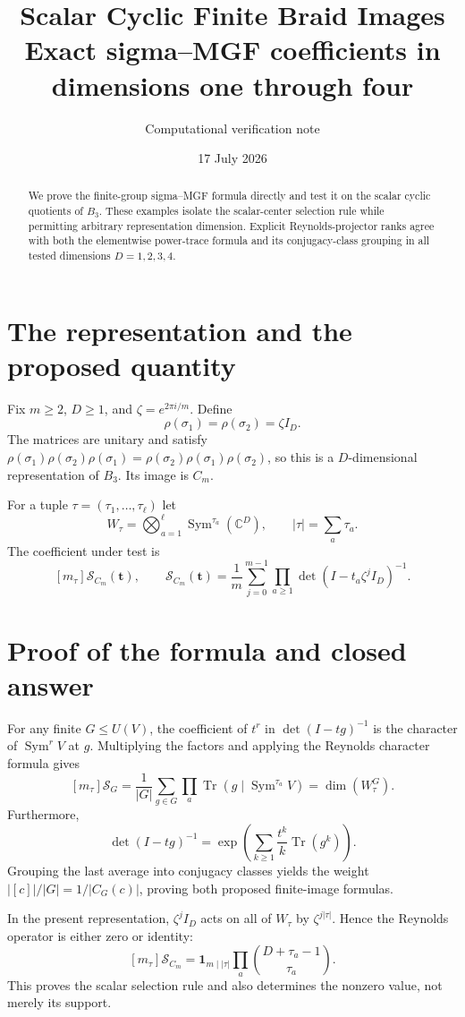 \documentclass[11pt]{article}
\title{\color{navy}\bfseries Scalar Cyclic Finite Braid Images\\
\large Exact sigma--MGF coefficients in dimensions one through four}
\author{Computational verification note}\date{17 July 2026}
\newcommand{\Sgm}{\mathcal S}
\begin{document}
\maketitle

\begin{abstract}
We prove the finite-group sigma--MGF formula directly and test it on the
scalar cyclic quotients of $B_3$.  These examples isolate the scalar-center
selection rule while permitting arbitrary representation dimension.  Explicit
Reynolds-projector ranks agree with both the elementwise power-trace formula
and its conjugacy-class grouping in all tested dimensions $D=1,2,3,4$.
\end{abstract}

\section{The representation and the proposed quantity}
Fix $m\geq2$, $D\geq1$, and $\zeta=e^{2\pi i/m}$.  Define
\[
 \rho(\sigma_1)=\rho(\sigma_2)=\zeta I_D.
\]
The matrices are unitary and satisfy
$\rho(\sigma_1)\rho(\sigma_2)\rho(\sigma_1)
=\rho(\sigma_2)\rho(\sigma_1)\rho(\sigma_2)$, so this is a
$D$-dimensional representation of $B_3$.  Its image is $C_m$.

For a tuple $\tau=(\tau_1,\ldots,\tau_\ell)$ let
\[
 W_\tau=\bigotimes_{a=1}^{\ell}\operatorname{Sym}^{\tau_a}(\mathbb C^D),
 \qquad |\tau|=\sum_a\tau_a.
\]
The coefficient under test is
\[
 [m_\tau]\Sgm_{C_m}(\mathbf t),\qquad
 \Sgm_{C_m}(\mathbf t)=\frac1m\sum_{j=0}^{m-1}
 \prod_{a\geq1}\det(I-t_a\zeta^jI_D)^{-1}.
\]

\section{Proof of the formula and closed answer}
For any finite $G\leq U(V)$, the coefficient of $t^r$ in
$\det(I-tg)^{-1}$ is the character of $\operatorname{Sym}^rV$ at $g$.
Multiplying the factors and applying the Reynolds character formula gives
\[
 [m_\tau]\Sgm_G
 =\frac1{|G|}\sum_{g\in G}\prod_a
 \operatorname{Tr}(g\mid\operatorname{Sym}^{\tau_a}V)
 =\dim(W_\tau^G).
\]
Furthermore,
\[
 \det(I-tg)^{-1}=\exp\left(\sum_{k\geq1}
 \frac{t^k}{k}\operatorname{Tr}(g^k)\right).
\]
Grouping the last average into conjugacy classes yields the weight
$|[c]|/|G|=1/|C_G(c)|$, proving both proposed finite-image formulas.

In the present representation, $\zeta^jI_D$ acts on all of $W_\tau$ by
$\zeta^{j|\tau|}$.  Hence the Reynolds operator is either zero or identity:
\[
 \boxed{[m_\tau]\Sgm_{C_m}=\mathbf1_{m\mid|\tau|}
 \prod_a\binom{D+\tau_a-1}{\tau_a}.}
\]
This proves the scalar selection rule and also determines the nonzero value,
not merely its support.
\end{document}
